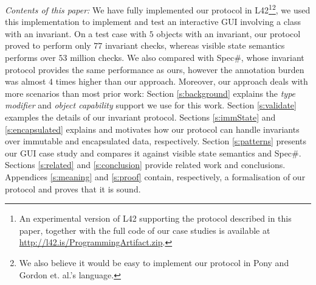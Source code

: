 \textit{Contents of this paper:}
We have fully implemented our protocol in L42\footnote{An experimental version of L42 supporting the protocol described in this paper, together with the full code of our case studies is available at \url{http://l42.is/ProgrammingArtifact.zip}.}\footnote{We also believe it would be easy to implement our protocol in Pony and Gordon et. al.'s language.}, we used this implementation to implement and test an interactive GUI involving a class with an invariant. On a test case with $5$ objects with an invariant, 
our protocol proved to perform only $77$ invariant checks, whereas visible state semantics performs over $53$ million checks. We also compared with Spec\#, whose invariant protocol provides the same performance as ours, however the annotation burden was almost $4$ times higher than our approach.
Moreover, our approach deals with more scenarios than most prior work: 
Section \ref{s:background} explains the \emph{type modifier} and \emph{object capability} support we use for this work.
Section \ref{s:validate} examples the details of our invariant protocol.
Sections \ref{s:immState} and \ref{s:encapsulated} explains and motivates how our protocol can handle invariants over immutable and encapsulated data, respectively.
Section \ref{s:patterns} presents our GUI case study and compares it against visible state semantics and Spec\#.
Sections \ref{s:related} and \ref{s:conclusion} provide related work and conclusions.
Appendices \ref{s:meaning} and \ref{s:proof} contain, respectively, a formalisation of our protocol and proves that it is sound.

